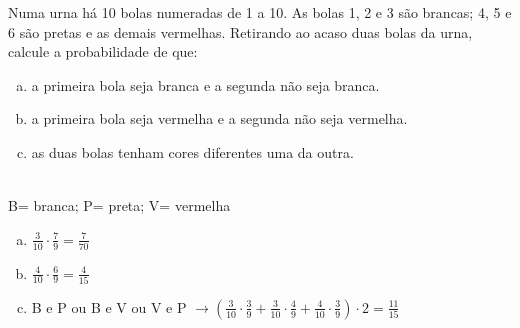 \begin{ex}
Numa urna há 10 bolas numeradas de 1 a 10. As bolas 1, 2 e 3 são brancas; 4, 5 e 6 são pretas e as demais vermelhas. Retirando ao acaso duas bolas da urna, calcule a probabilidade de que:
   \begin{enumerate}[(a)]
   \item a primeira bola seja branca e a segunda não seja branca.
   \item  a primeira bola seja vermelha e a segunda não seja vermelha.
   \item as duas bolas tenham cores diferentes uma da outra.
   \end{enumerate}
     \begin{sol}
      \phantom{A} \\
      B= branca;  P= preta;  V= vermelha
       \begin{enumerate} [(a)]
           \item $\frac{3}{10}\cdot\frac{7}{9}=\frac{7}{70}$
           \item $\frac{4}{10}\cdot\frac{6}{9}=\frac{4}{15}$
           \item B e P ou B e V ou V e P $\rightarrow (\frac{3}{10}\cdot\frac{3}{9}+\frac{3}{10}\cdot\frac{4}{9}+\frac{4}{10}\cdot\frac{3}{9})\cdot2=\frac{11}{15}$
       \end{enumerate}
     \end{sol}
\end{ex}